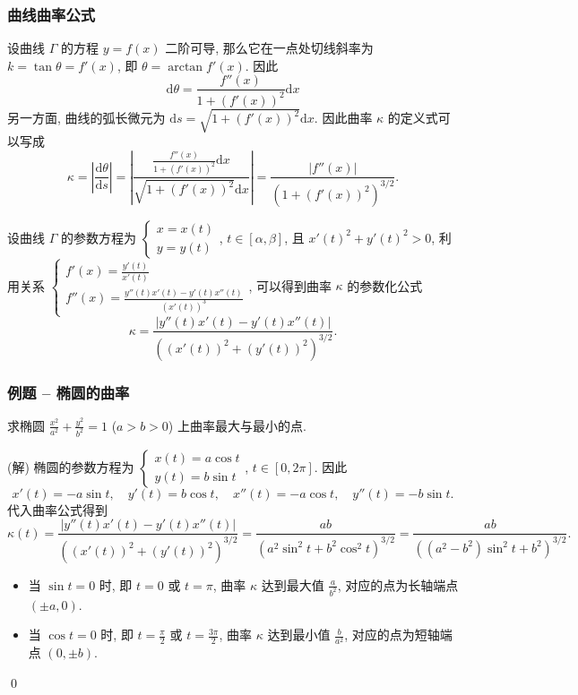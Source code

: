 \begin{frame}
\frametitle{曲线曲率公式}

设曲线 $\Gamma$ 的方程 $y = f(x)$ 二阶可导, 那么它在一点处切线斜率为 $k = \tan \theta = f'(x)$, 即 $\theta = \arctan f'(x)$. 因此
\[
\mathrm{d} \theta = \frac{f''(x)}{1 + (f'(x))^2} \mathrm{d} x
\]
另一方面, 曲线的弧长微元为 $\mathrm{d} s = \sqrt{1 + (f'(x))^2} \mathrm{d} x$. 因此曲率 $\kappa$ 的定义式可以写成
\[
\kappa = \left| \frac{\mathrm{d}\theta}{\mathrm{d}s} \right| = \left| \frac{\frac{f''(x)}{1 + (f'(x))^2} \mathrm{d} x}{\sqrt{1 + (f'(x))^2} \mathrm{d} x} \right| = \frac{|f''(x)|}{(1 + (f'(x))^2)^{3/2}}.
\]

\pause

设曲线 $\Gamma$ 的参数方程为 $\begin{cases} x = x(t) \\[3pt] y = y(t) \end{cases}$, $t \in [\alpha, \beta]$, 且 $x'(t)^2 + y'(t)^2 > 0$, 利用关系 $\begin{cases} f'(x) = \frac{y'(t)}{x'(t)} \\[3pt] f''(x) = \frac{y''(t)x'(t) - y'(t)x''(t)}{(x'(t))^3} \end{cases}$, 可以得到曲率 $\kappa$ 的参数化公式
\[
\kappa = \frac{|y''(t)x'(t) - y'(t)x''(t)|}{\left((x'(t))^2 + (y'(t))^2\right)^{3/2}}.
\]

\end{frame}


\begin{frame}
\frametitle{例题 -- 椭圆的曲率}

\begin{question}
求椭圆 $\frac{x^2}{a^2} + \frac{y^2}{b^2} = 1$ ($a > b > 0$) 上曲率最大与最小的点.
\end{question}

\pause

\startproof[bg=yellow, fg=red](解)
椭圆的参数方程为 $\begin{cases} x(t) = a\cos t \\[3pt] y(t) = b\sin t \end{cases}$, $t \in [0, 2\pi]$. 因此
\[
x'(t) = -a\sin t, \quad y'(t) = b\cos t, \quad x''(t) = -a\cos t, \quad y''(t) = -b\sin t.
\]
代入曲率公式得到
\[
\kappa(t) = \frac{|y''(t)x'(t) - y'(t)x''(t)|}{\left((x'(t))^2 + (y'(t))^2\right)^{3/2}} = \frac{ab}{\left(a^2 \sin^2 t + b^2 \cos^2 t\right)^{3/2}} = \frac{ab}{\left((a^2 - b^2) \sin^2 t + b^2\right)^{3/2}}.
\]
\begin{itemize}
\item 当 $\sin t = 0$ 时, 即 $t = 0$ 或 $t = \pi$, 曲率 $\kappa$ 达到最大值 $\frac{a}{b^2}$, 对应的点为长轴端点 $(\pm a, 0)$.
\item 当 $\cos t = 0$ 时, 即 $t = \frac{\pi}{2}$ 或 $t = \frac{3\pi}{2}$, 曲率 $\kappa$ 达到最小值 $\frac{b}{a^2}$, 对应的点为短轴端点 $(0, \pm b)$.
\end{itemize}
\qed

\end{frame}



